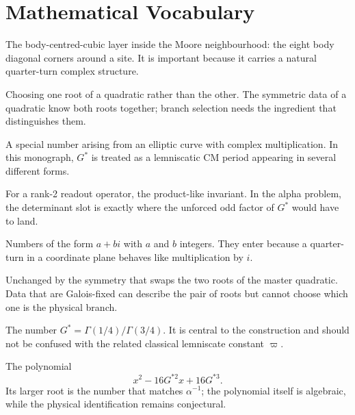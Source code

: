 \section*{Mathematical Vocabulary}

\begin{termnotes}
  \item[BCC layer.]
  The body-centred-cubic layer inside the Moore neighbourhood: the eight body
  diagonal corners around a site. It is important because it carries a natural
  quarter-turn complex structure.

  \item[Branch selection.]
  Choosing one root of a quadratic rather than the other. The symmetric data of
  a quadratic know both roots together; branch selection needs the ingredient
  that distinguishes them.

  \item[CM period.]
  A special number arising from an elliptic curve with complex multiplication.
  In this monograph, $G^*$ is treated as a lemniscatic CM period appearing in
  several different forms.

  \item[Determinant.]
  For a rank-2 readout operator, the product-like invariant. In the alpha
  problem, the determinant slot is exactly where the unforced odd factor of
  $G^*$ would have to land.

  \item[Gaussian integers.]
  Numbers of the form $a+bi$ with $a$ and $b$ integers. They enter because a
  quarter-turn in a coordinate plane behaves like multiplication by $i$.

  \item[Galois-fixed.]
  Unchanged by the symmetry that swaps the two roots of the master quadratic.
  Data that are Galois-fixed can describe the pair of roots but cannot choose
  which one is the physical branch.

  \item[Lemniscatic ratio.]
  The number $G^*=\Gamma(1/4)/\Gamma(3/4)$. It is central to the construction
  and should not be confused with the related classical lemniscate constant
  $\varpi$.

  \item[Master quadratic.]
  The polynomial
  \[
    x^2-16G^{*2}x+16G^{*3}.
  \]
  Its larger root is the number that matches $\alpha^{-1}$; the polynomial
  itself is algebraic, while the physical identification remains conjectural.


\end{termnotes}
